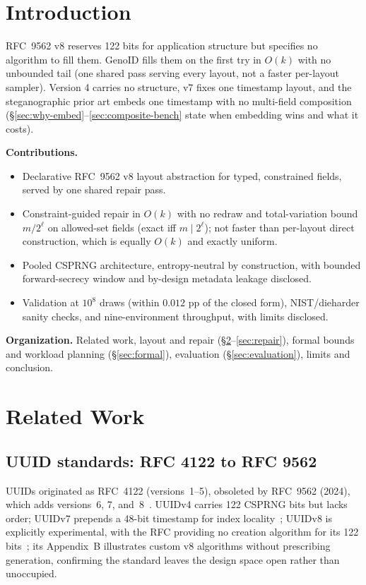 \documentclass{svproc}
\begin{document}
\section{Introduction}

RFC~9562 v8 reserves 122 bits for application structure but specifies no algorithm to fill them. GenoID fills them on the first try in $O(k)$ with no unbounded tail (one shared pass serving every layout, not a faster per-layout sampler). Version 4 carries no structure, v7 fixes one timestamp layout, and the steganographic prior art embeds one timestamp with no multi-field composition (\S\ref{sec:why-embed}--\ref{sec:composite-bench} state when embedding wins and what it costs).



\noindent\textbf{Contributions.}
\begin{itemize}
    \item Declarative RFC~9562 v8 layout abstraction for typed, constrained fields, served by one shared repair pass.
    \item Constraint-guided repair in $O(k)$ with no redraw and total-variation bound $m/2^\ell$ on allowed-set fields (exact iff $m \mid 2^\ell$); not faster than per-layout direct construction, which is equally $O(k)$ and exactly uniform.
    \item Pooled CSPRNG architecture, entropy-neutral by construction, with bounded forward-secrecy window and by-design metadata leakage disclosed.
    \item Validation at $10^8$ draws (within $0.012$ pp of the closed form), NIST/dieharder sanity checks, and nine-environment throughput, with limits disclosed.
\end{itemize}

\noindent\textbf{Organization.} Related work, layout and repair (\S\ref{sec:related-work}--\ref{sec:repair}), formal bounds and workload planning (\S\ref{sec:formal}), evaluation (\S\ref{sec:evaluation}), limits and conclusion.

\section{Related Work}
\label{sec:related-work}
\subsection{UUID standards: RFC 4122 to RFC 9562}
UUIDs originated as RFC~4122 (versions~1--5), obsoleted by RFC~9562 (2024), which adds versions~6, 7, and~8~\cite{4}. UUIDv4 carries 122 CSPRNG bits but lacks order; UUIDv7 prepends a 48-bit timestamp for index locality~\cite[\S5.7]{4}; UUIDv8 is explicitly experimental, with the RFC providing no creation algorithm for its 122 bits~\cite[\S5.8]{4}; its Appendix~B illustrates custom v8 algorithms without prescribing generation, confirming the standard leaves the design space open rather than unoccupied.
\end{document}
